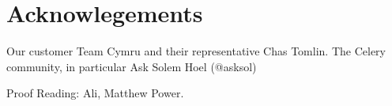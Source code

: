 \section*{Acknowlegements}

Our customer Team Cymru and their representative Chas Tomlin.
The Celery community, in particular Ask Solem Hoel (@asksol) 

Proof Reading: Ali, Matthew Power.
